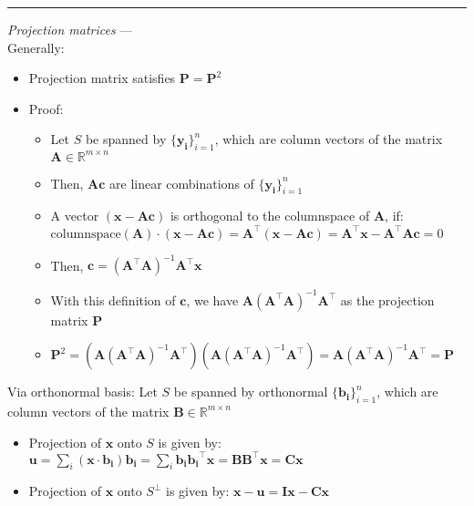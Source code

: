 {\color{lightgray}\hrule height 0.001mm}

\emph{Projection matrices} ---\\
Generally:
\begin{itemize}
    \item Projection matrix satisfies $\boldsymbol{P} = \boldsymbol{P}^2$
    \item Proof:
    \begin{itemize}
        \item Let $S$ be spanned by $\{\boldsymbol{y_i}\}_{i=1}^n$, which are column vectors of the matrix $\boldsymbol{A} \in \mathbb{R}^{m \times n}$
        \item Then, $\boldsymbol{A} \boldsymbol{c}$ are linear combinations of $\{\boldsymbol{y_i}\}_{i=1}^n$
        \item A vector $(\boldsymbol{x} - \boldsymbol{A} \boldsymbol{c})$ is orthogonal to the columnspace of $\boldsymbol{A}$, if: $\textrm{columnspace}(\boldsymbol{A}) \cdot (\boldsymbol{x} - \boldsymbol{A} \boldsymbol{c}) = \boldsymbol{A}^\intercal (\boldsymbol{x} - \boldsymbol{A} \boldsymbol{c}) = \boldsymbol{A}^\intercal \boldsymbol{x} - \boldsymbol{A}^\intercal \boldsymbol{A} \boldsymbol{c} = 0$
        \item Then, $\boldsymbol{c} = (\boldsymbol{A}^\intercal\boldsymbol{A})^{-1} \boldsymbol{A}^\intercal \boldsymbol{x}$ 
        \item With this definition of $\boldsymbol{c}$, we have $\boldsymbol{A} (\boldsymbol{A}^\intercal\boldsymbol{A})^{-1} \boldsymbol{A}^\intercal$ as the projection matrix $\boldsymbol{P}$
        \item $\boldsymbol{P}^2 = (\boldsymbol{A} (\boldsymbol{A}^\intercal\boldsymbol{A})^{-1} \boldsymbol{A}^\intercal) (\boldsymbol{A} (\boldsymbol{A}^\intercal\boldsymbol{A})^{-1} \boldsymbol{A}^\intercal) = \boldsymbol{A} (\boldsymbol{A}^\intercal\boldsymbol{A})^{-1} \boldsymbol{A}^\intercal = \boldsymbol{P}$
    \end{itemize}
\end{itemize}
Via orthonormal basis: Let $S$ be spanned by orthonormal $\{\boldsymbol{b_i}\}_{i=1}^n$, which are column vectors of the matrix $\boldsymbol{B} \in \mathbb{R}^{m \times n}$
\begin{itemize}
    \item Projection of $\boldsymbol{x}$ onto $S$ is given by: $\boldsymbol{u} = \sum_i (\boldsymbol{x} \cdot \boldsymbol{b_i}) \boldsymbol{b_i} = \sum_i \boldsymbol{b_i} \boldsymbol{b_i}^\intercal \boldsymbol{x} = \boldsymbol{B}\boldsymbol{B}^\intercal\boldsymbol{x} = \boldsymbol{C}\boldsymbol{x}$
    \item Projection of $\boldsymbol{x}$ onto $S^\bot$ is given by: $\boldsymbol{x} - \boldsymbol{u} = \boldsymbol{I}\boldsymbol{x} - \boldsymbol{C}\boldsymbol{x}$
\end{itemize}
